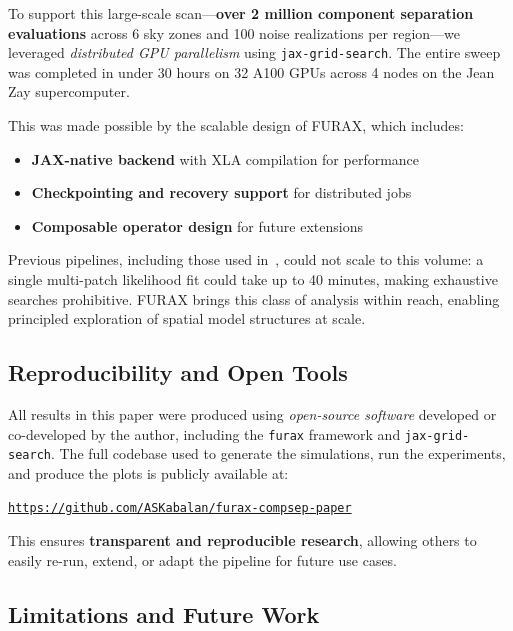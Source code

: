 \documentclass[%
 reprint,
bibnotes,
 amsmath,amssymb,
 aps,
floatfix, 
]{revtex4-2}
\begin{document}
To support this large-scale scan---\textbf{over 2 million component separation evaluations} across 6 sky zones and 100 noise realizations per region---we leveraged \textit{distributed GPU parallelism} using \texttt{jax-grid-search}. The entire sweep was completed in under 30 hours on 32 A100 GPUs across 4 nodes on the Jean Zay supercomputer.

This was made possible by the scalable design of \textsc{FURAX}, which includes:
\begin{itemize}
    \item \textbf{JAX-native backend} with XLA compilation for performance
    \item \textbf{Checkpointing and recovery support} for distributed jobs
    \item \textbf{Composable operator design} for future extensions
\end{itemize}

Previous pipelines, including those used in~\cite{LiteBIRD_PTEP_2022}, could not scale to this volume: a single multi-patch likelihood fit could take up to 40 minutes, making exhaustive searches prohibitive. \textsc{FURAX} brings this class of analysis within reach, enabling principled exploration of spatial model structures at scale.

\subsection*{Reproducibility and Open Tools}

All results in this paper were produced using \textit{open-source software} developed or co-developed by the author, including the \texttt{furax} framework and \texttt{jax-grid-search}. The full codebase used to generate the simulations, run the experiments, and produce the plots is publicly available at:

\begin{center}
\texttt{\href{https://github.com/ASKabalan/furax-compsep-paper}{https://github.com/ASKabalan/furax-compsep-paper}}
\end{center}

This ensures \textbf{transparent and reproducible research}, allowing others to easily re-run, extend, or adapt the pipeline for future use cases.

\subsection*{Limitations and Future Work}
\end{document}
